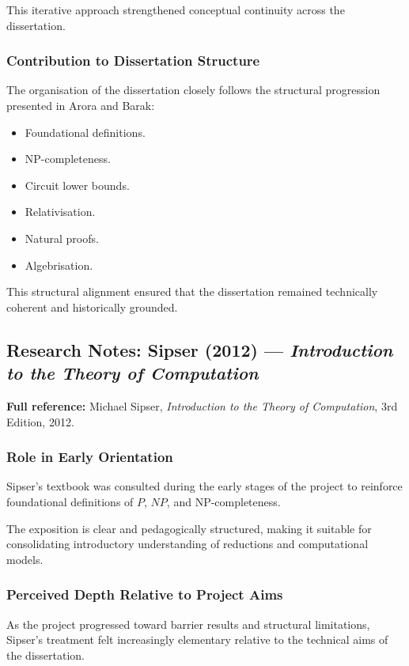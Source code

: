 \documentclass[12pt]{article}
\begin{document}
This iterative approach strengthened conceptual continuity across the dissertation.

\subsubsection*{Contribution to Dissertation Structure}

The organisation of the dissertation closely follows the structural progression presented in Arora and Barak:

\begin{itemize}
\item Foundational definitions.
\item NP-completeness.
\item Circuit lower bounds.
\item Relativisation.
\item Natural proofs.
\item Algebrisation.
\end{itemize}

This structural alignment ensured that the dissertation remained technically coherent and historically grounded.

\subsection{Research Notes: Sipser (2012) --- \textit{Introduction to the Theory of Computation}}

\textbf{Full reference:} Michael Sipser,
\textit{Introduction to the Theory of Computation},
3rd Edition, 2012.

\subsubsection*{Role in Early Orientation}

Sipser's textbook was consulted during the early stages of the project to reinforce foundational definitions of $P$, $NP$, and NP-completeness.

The exposition is clear and pedagogically structured, making it suitable for consolidating introductory understanding of reductions and computational models.

\subsubsection*{Perceived Depth Relative to Project Aims}

As the project progressed toward barrier results and structural limitations, Sipser's treatment felt increasingly elementary relative to the technical aims of the dissertation.
\end{document}
